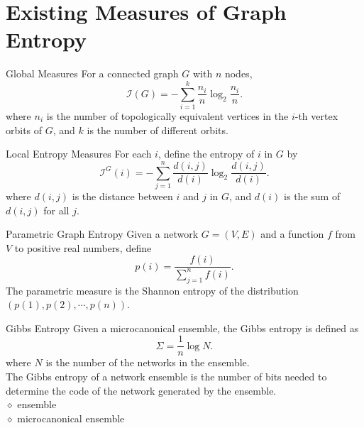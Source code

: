 \documentclass[t,aspectratio=169,usepdftitle=false]{beamer}
\begin{document}
\section{Existing Measures of Graph Entropy}
  \begin{frame}{Global Measures}
    For a connected graph $G$ with $n$ nodes,
    \begin{equation}
      \mathcal{I}(G) = -\sum_{i=1}^{k} \frac{n_i}{n} \log_{2} \frac{n_i}{n}.
    \end{equation}
    where $n_i$ is the number of topologically equivalent vertices in the $i$-th vertex orbits of $G$, 
    and $k$ is the number of different orbits.
  \end{frame}

  \begin{frame}{Local Entropy Measures}
    For each $i$, define the entropy of $i$ in $G$ by
    \begin{equation}
      \mathcal{I}^{G}(i) = -\sum_{j=1}^{n} \frac{d(i,j)}{d(i)} \log_2 \frac{d(i,j)}{d(i)}.
    \end{equation}
    where $d(i,j)$ is the distance between $i$ and $j$ in $G$, and $d(i)$ is the sum of $d(i,j)$ for all $j$.
  \end{frame}

  \begin{frame}{Parametric Graph Entropy}
    Given a network $G=(V,E)$ and a function $f$ from $V$ to positive real numbers, define
    \begin{equation}
      p(i) = \frac{f(i)}{\sum_{j=1}^{n}f(i)}.
    \end{equation}
    \vspace{0.2cm}
    \alert{The parametric measure is the Shannon entropy of the distribution $(p(1),p(2),\cdots,p(n))$.}
  \end{frame}

  \begin{frame}{Gibbs Entropy}
    Given a microcanonical ensemble, the Gibbs entropy is defined as
    \begin{equation}
      \Sigma = \frac{1}{n} \log N.
    \end{equation}
    where $N$ is the number of the networks in the ensemble. \\
    \vspace{0.2cm}
    \alert{The Gibbs entropy of a network ensemble is the number of bits needed to determine the code 
    of the network generated by the ensemble.} \\
    \vspace{0.2cm}
    $\diamond$ ensemble \\
    $\diamond$ microcanonical ensemble \\ 
  \end{frame}
\end{document}
